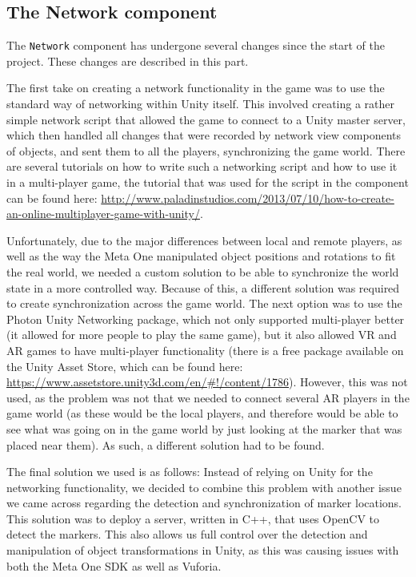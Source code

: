 		\subsection{The Network component} \label{ssec:networkcomponent}
			The \texttt{Network} component has undergone several changes since the start
			of the project. These changes are described in this part.
			
			The first take on creating a network functionality in the game
			was to use the standard way of networking within Unity itself.
			This involved creating a rather simple network script that
			allowed the game to connect to a Unity master server, which then handled
			all changes that were recorded by network view components of objects,
			and sent them to all the players, synchronizing the game world.
			There are several tutorials on how to write such a networking
			script and how to use it in a multi-player game, the tutorial that
			was used for the script in the component can be found here:
			\url{http://www.paladinstudios.com/2013/07/10/how-to-create-an-online-multiplayer-game-with-unity/}.
			
			Unfortunately, due to the major differences between local and remote
			players, as well as the way the Meta One manipulated object positions
			and rotations to fit the real world, we needed a custom solution to
			be able to synchronize the world state in a more controlled way.
			Because of this, a different solution was required to create 
			synchronization across the game world. The next option was to use the 
			Photon Unity Networking package, which not only supported multi-player 
			better (it allowed for more people to play the same game), but it also 
			allowed VR and AR games to have multi-player functionality (there is a 
			free package available on the Unity Asset Store, which can be found here:
			\url{https://www.assetstore.unity3d.com/en/#!/content/1786}). However,
			this was not used, as the problem was not that we needed to connect
			several AR players in the game world (as these would be the local players,
			and therefore would be able to see what was going on in the game world
			by just looking at the marker that was placed near them). As such,
			a different solution had to be found.
			
			The final solution we used is as follows: Instead of 
			relying on Unity for the networking functionality, we decided to 
			combine this problem with another issue we came across regarding 
			the detection and synchronization of marker locations. This solution
			was to deploy a server, written in C++, that uses OpenCV to detect 
			the markers. This also allows us full control over the detection and 
			manipulation of object transformations in Unity, as this was causing 
			issues with both the Meta One SDK as well as Vuforia.
			

